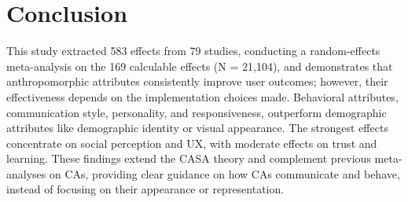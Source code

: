 \documentclass[manuscript,screen,review,anonymous]{acmart}
\DeclareRobustCommand{\change}[1]{%
    \textcolor{changeblue}{#1}%
  }
\DeclareRobustCommand{\change}[1]{#1}
\begin{document}



\section{Conclusion}

\change{This study extracted 583 effects from 79 studies, conducting a random-effects meta-analysis on the 169 calculable effects (N = 21,104), and demonstrates} that anthropomorphic attributes consistently improve user outcomes; however, their effectiveness depends on the implementation choices made. Behavioral attributes, communication style, personality, and responsiveness, outperform demographic attributes like demographic identity or visual appearance. The strongest effects concentrate on social perception and UX, with moderate effects on trust and learning. These findings extend the CASA theory and complement previous meta-analyses on CAs, providing clear guidance on how CAs communicate and behave, instead of focusing on their appearance or representation.



\end{document}
